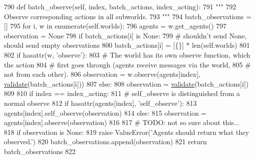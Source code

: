 \begin{DoxyCode}
790     \textcolor{keyword}{def }batch\_observe(self, index, batch\_actions, index\_acting):
791         \textcolor{stringliteral}{"""}
792 \textcolor{stringliteral}{        Observe corresponding actions in all subworlds.}
793 \textcolor{stringliteral}{        """}
794         batch\_observations = []
795         \textcolor{keywordflow}{for} i, w \textcolor{keywordflow}{in} enumerate(self.worlds):
796             agents = w.get\_agents()
797             observation = \textcolor{keywordtype}{None}
798             \textcolor{keywordflow}{if} batch\_actions[i] \textcolor{keywordflow}{is} \textcolor{keywordtype}{None}:
799                 \textcolor{comment}{# shouldn't send None, should send empty observations}
800                 batch\_actions[i] = [\{\}] * len(self.worlds)
801 
802             \textcolor{keywordflow}{if} hasattr(w, \textcolor{stringliteral}{'observe'}):
803                 \textcolor{comment}{# The world has its own observe function, which the action}
804                 \textcolor{comment}{# first goes through (agents receive messages via the world,}
805                 \textcolor{comment}{# not from each other).}
806                 observation = w.observe(agents[index], \hyperlink{namespaceparlai_1_1core_1_1worlds_afc3fad603b7bce41dbdc9cdc04a9c794}{validate}(batch\_actions[i]))
807             \textcolor{keywordflow}{else}:
808                 observation = \hyperlink{namespaceparlai_1_1core_1_1worlds_afc3fad603b7bce41dbdc9cdc04a9c794}{validate}(batch\_actions[i])
809 
810             \textcolor{keywordflow}{if} index == index\_acting:
811                 \textcolor{comment}{# self\_observe is distinguished from a normal observe}
812                 \textcolor{keywordflow}{if} hasattr(agents[index], \textcolor{stringliteral}{'self\_observe'}):
813                     agents[index].self\_observe(observation)
814             \textcolor{keywordflow}{else}:
815                 observation = agents[index].observe(observation)
816 
817             \textcolor{comment}{# TODO: not so sure about this...}
818             \textcolor{keywordflow}{if} observation \textcolor{keywordflow}{is} \textcolor{keywordtype}{None}:
819                 \textcolor{keywordflow}{raise} ValueError(\textcolor{stringliteral}{'Agents should return what they observed.'})
820             batch\_observations.append(observation)
821         \textcolor{keywordflow}{return} batch\_observations
822 
\end{DoxyCode}
\mbox{\label{classparlai_1_1core_1_1worlds_1_1BatchWorld_a2b8dd323969084eedc03a7ab44647117}} 
